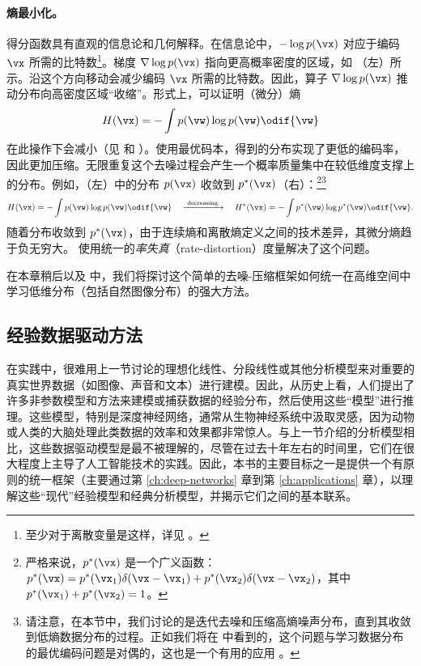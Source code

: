\documentclass[../../book-main_zh.tex]{subfiles}
\begin{document}
\paragraph{熵最小化。} 得分函数具有直观的信息论和几何解释。在信息论中，\(-\log p(\vx)\) 对应于编码
\(\vx\) 所需的比特数\footnote{至少对于离散变量是这样，详见 。}。梯度
\(\nabla \log p(\vx)\) 指向更高概率密度的区域，如
（左）所示。沿这个方向移动会减少编码 \(\vx\) 所需的比特数。因此，算子
\(\nabla \log p(\vx)\) 推动分布向高密度区域“收缩”。形式上，可以证明（微分）熵
\begin{equation}
    H(\vx) = - \int p(\vw) \log p(\vw) \odif{\vw}
\end{equation}
在此操作下会减小（见  和
）。使用最优码本，得到的分布实现了更低的编码率，因此更加压缩。无限重复这个去噪过程会产生一个概率质量集中在较低维度支撑上的分布。例如，（左）中的分布
\(p(\vx)\) 收敛到 \(p^{*}(\vx)\)（右）：\footnote{严格来说，\(p^{*}(\vx)\)
    是一个广义函数：\(p^{*}(\vx) = p^{*}(\vx_{1})\delta(\vx-\vx_{1}) +
    p^{*}(\vx_{2}) \delta(\vx-\vx_{2})\)，其中 \(p^{*}(\vx_{1}) +
        p^{*}(\vx_{2}) =
1\)。}\footnote{请注意，在本节中，我们讨论的是迭代去噪和压缩高熵噪声分布，直到其收敛到低熵数据分布的过程。正如我们将在
     中看到的，这个问题与学习数据分布的最优编码问题是对偶的，这也是一个有用的应用
\cite{relic2024lossy}。}
\begin{equation}
    H(\vx) = - \int p(\vw) \log p(\vw) \odif{\vw} \quad
    \xrightarrow{\hspace{1mm} \text{decreasing} \hspace{1mm}} \quad
    H^{*}(\vx) = - \int p^{*}(\vw) \log p^{*}(\vw) \odif{\vw}.
\end{equation}
随着分布收敛到 \(p^{*}(\vx)\)，由于连续熵和离散熵定义之间的技术差异，其微分熵趋于负无穷大。
 使用统一的\textit{率失真}（rate-distortion）度量解决了这个问题。

在本章稍后以及
中，我们将探讨这个简单的去噪-压缩框架如何统一在高维空间中学习低维分布（包括自然图像分布）的强大方法。

\subsection{经验数据驱动方法}
在实践中，很难用上一节讨论的理想化线性、分段线性或其他分析模型来对重要的真实世界数据（如图像、声音和文本）进行建模。因此，从历史上看，人们提出了许多非参数模型和方法来建模或捕获数据的经验分布，然后使用这些“模型”进行推理。这些模型，特别是深度神经网络，通常从生物神经系统中汲取灵感，因为动物或人类的大脑处理此类数据的效率和效果都非常惊人。与上一节介绍的分析模型相比，这些数据驱动模型是最不被理解的，尽管在过去十年左右的时间里，它们在很大程度上主导了人工智能技术的实践。因此，本书的主要目标之一是提供一个有原则的统一框架（主要通过第
\ref{ch:deep-networks} 章到第 \ref{ch:applications}
章），以理解这些“现代”经验模型和经典分析模型，并揭示它们之间的基本联系。
\end{document}
